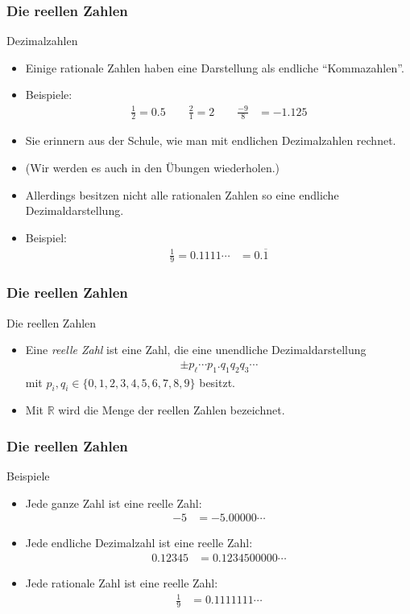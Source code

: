 \documentclass{beamer}
\renewcommand{\emph}[1]{{\textcolor{solarizedRed}{\itshape #1}}}
\newcommand\RR{\mathbb R}
\newcommand{\Ue}{\"U}
\newcommand{\mytitle}{Die reellen Zahlen}
\begin{document}
\begin{frame}\frametitle{\mytitle}
	\begin{block}{Dezimalzahlen}
	\begin{itemize}
		\item Einige rationale Zahlen haben eine Darstellung als endliche ``Kommazahlen''.
		\item \alert{Beispiele:}
			\begin{align*}
				\frac{1}{2}=0.5\qquad\frac{2}{1}=2\qquad\frac{-9}{8}&=-1.125
			\end{align*}
		\item Sie erinnern aus der Schule, wie man mit endlichen Dezimalzahlen rechnet.
		\item (Wir werden es auch in den \Ue bungen wiederholen.)
		\item Allerdings besitzen nicht alle rationalen Zahlen so eine endliche Dezimaldarstellung.
		\item \alert{Beispiel:}
			\begin{align*}
				\frac{1}{9}=0.1111\cdots&=0.\overline 1
			\end{align*}
	\end{itemize}
	\end{block}
\end{frame}

\begin{frame}\frametitle{\mytitle}
	\begin{block}{Die reellen Zahlen}
	\begin{itemize}
		\item Eine \emph{reelle Zahl} ist eine Zahl, die eine unendliche Dezimaldarstellung
			\begin{align*}
			\pm p_\ell\cdots p_1.q_1q_2q_3\cdots
			\end{align*}
			mit $p_i,q_i\in\{0,1,2,3,4,5,6,7,8,9\}$ besitzt.
		\item Mit $\RR$ wird die Menge der reellen Zahlen bezeichnet.
	\end{itemize}
	\end{block}
\end{frame}

\begin{frame}\frametitle{\mytitle}
	\begin{block}{Beispiele}
	\begin{itemize}
		\item Jede ganze Zahl ist eine reelle Zahl:
			\begin{align*}
				-5&=-5.00000\cdots
			\end{align*}
		\item Jede endliche Dezimalzahl ist eine reelle Zahl:
			\begin{align*}
				0.12345&=0.1234500000\cdots
			\end{align*}
		\item Jede rationale Zahl ist eine reelle Zahl:
			\begin{align*}
				\frac{1}{9}&=0.1111111\cdots
			\end{align*}
	\end{itemize}
	\end{block}
\end{frame}
\end{document}
